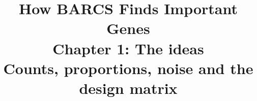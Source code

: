 \documentclass[12pt]{article}
\title{\textbf{How BARCS Finds Important Genes}\\[6pt]
\Large Chapter 1: The ideas\\[4pt]
\large Counts, proportions, noise and the design matrix}
\author{\guideauthor}
\date{\guidedate}
\begin{document}
\maketitle
\aboutbox
\tableofcontents
\newpage

\end{document}
